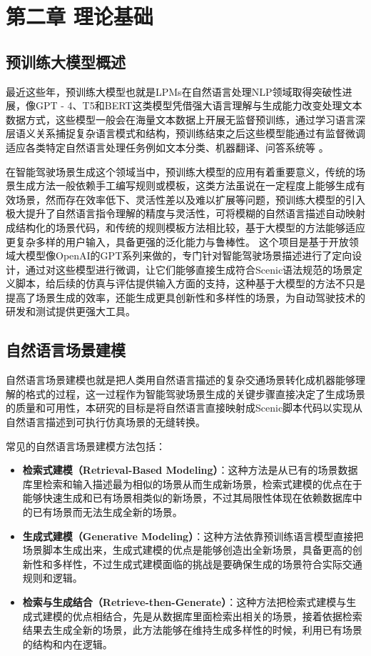 \chapter{第二章 理论基础}
\section{预训练大模型概述}
最近这些年，预训练大模型也就是LPMs在自然语言处理NLP领域取得突破性进展，像GPT - 4、T5和BERT这类模型凭借强大语言理解与生成能力改变处理文本数据方式，这些模型一般会在海量文本数据上开展无监督预训练，通过学习语言深层语义关系捕捉复杂语言模式和结构，预训练结束之后这些模型能通过有监督微调适应各类特定自然语言处理任务例如文本分类、机器翻译、问答系统等 。

在智能驾驶场景生成这个领域当中，预训练大模型的应用有着重要意义，传统的场景生成方法一般依赖手工编写规则或模板，这类方法虽说在一定程度上能够生成有效场景，然而存在效率低下、灵活性差以及难以扩展等问题，预训练大模型的引入极大提升了自然语言指令理解的精度与灵活性，可将模糊的自然语言描述自动映射成结构化的场景代码，和传统的规则模板方法相比较，基于大模型的方法能够适应更复杂多样的用户输入，具备更强的泛化能力与鲁棒性。
这个项目是基于开放领域大模型像OpenAI的GPT系列来做的，专门针对智能驾驶场景描述进行了定向设计，通过对这些模型进行微调，让它们能够直接生成符合Scenic语法规范的场景定义脚本，给后续的仿真与评估提供输入方面的支持，这种基于大模型的方法不只是提高了场景生成的效率，还能生成更具创新性和多样性的场景，为自动驾驶技术的研发和测试提供更强大工具。

\section{自然语言场景建模}
自然语言场景建模也就是把人类用自然语言描述的复杂交通场景转化成机器能够理解的格式的过程，这一过程作为智能驾驶场景生成的关键步骤直接决定了生成场景的质量和可用性，本研究的目标是将自然语言直接映射成Scenic脚本代码以实现从自然语言描述到可执行仿真场景的无缝转换。

常见的自然语言场景建模方法包括：
\begin{itemize}
	\item \textbf{检索式建模（Retrieval-Based Modeling）}：这种方法是从已有的场景数据库里检索和输入描述最为相似的场景从而生成新场景，检索式建模的优点在于能够快速生成和已有场景相类似的新场景，不过其局限性体现在依赖数据库中的已有场景而无法生成全新的场景。
	\item \textbf{生成式建模（Generative Modeling）}：这种方法依靠预训练语言模型直接把场景脚本生成出来，生成式建模的优点是能够创造出全新场景，具备更高的创新性和多样性，不过生成式建模面临的挑战是要确保生成的场景符合实际交通规则和逻辑。
	\item \textbf{检索与生成结合（Retrieve-then-Generate）}：这种方法把检索式建模与生成式建模的优点相结合，先是从数据库里面检索出相关的场景，接着依据检索结果去生成全新的场景，此方法能够在维持生成多样性的时候，利用已有场景的结构和内在逻辑。
\end{itemize}

